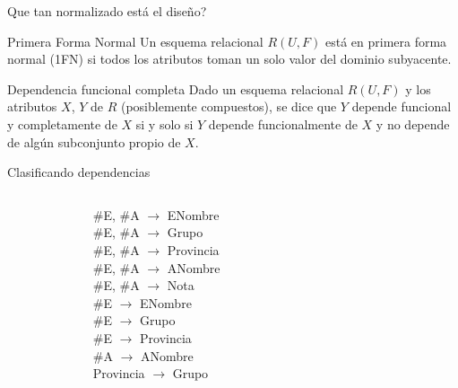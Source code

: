 \begin{frame}{Que tan normalizado está el diseño?}
    \begin{block}{Primera Forma Normal}
        Un esquema relacional $R(U,F)$ est\'a en primera forma
        normal (1FN) si todos los atributos toman un solo valor del dominio
        subyacente.
        
    \end{block}
\end{frame}


\begin{frame}{Dependencia funcional completa}
    Dado un esquema relacional $R(U,F)$ y los atributos $X$, $Y$ de $R$
    (posiblemente compuestos), se dice que $Y$ depende funcional
    y completamente de $X$ si y solo si $Y$ depende funcionalmente de
    $X$ y no depende de alg\'un subconjunto propio de $X$.
\end{frame}

\begin{frame}{Clasificando dependencias}
    \centering
    \begin{columns}[T]
        \begin{column}{0.2\linewidth}
            
        \end{column}
        \begin{column}{0.3\linewidth}
            {
            \#E, \#A $\to$ ENombre\\
            \#E, \#A $\to$ Grupo\\
            \#E, \#A $\to$ Provincia\\
            \#E, \#A $\to$ ANombre\\
            \vspace{1mm}
            }
            {
            \#E, \#A $\to$ Nota\\
            \#E $\to$ ENombre\\
            \#E $\to$ Grupo\\
            \#E $\to$ Provincia\\
            \#A $\to$ ANombre\\
            Provincia $\to$ Grupo
            }
        \end{column}
        \begin{column}{0.3\linewidth}
        \end{column}
        \begin{column}{0.2\linewidth}
            
        \end{column}
    \end{columns}
        
\end{frame}

